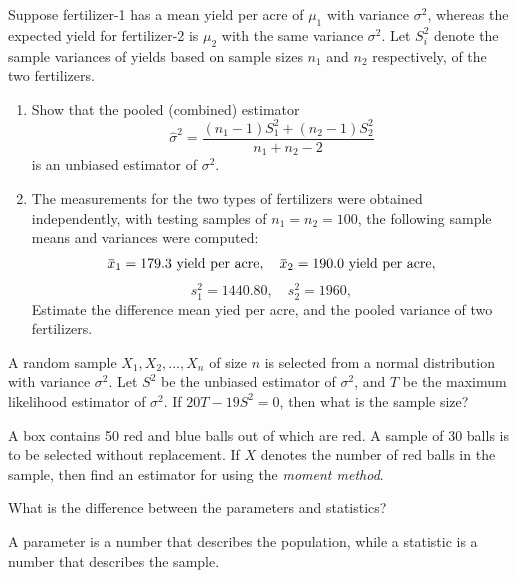 \begin{mdframed}
    \begin{Exercise}
    Suppose fertilizer-1 has a mean yield per acre of $\mu_1$
    with variance $\sigma^2$, whereas the expected yield for fertilizer-2 is $\mu_2$ with the
    same variance $\sigma^2$. Let $S^2_i$ denote the sample variances of yields based on
    sample sizes $n_1$ and $n_2$ respectively, of the two fertilizers.
    \begin{enumerate}
        \item Show that the pooled (combined) estimator 
        \[
            \hat{\sigma}^2 = \frac{(n_1 - 1)S^2_1 + (n_2 - 1)S^2_2}{n_1 + n_2 - 2}
        \]
        is an unbiased estimator of $\sigma^2$.
        \item The measurements for the two types of fertilizers were obtained independently, with 
        testing samples of $n_1 = n_2 = 100$, the following sample means and variances were computed:
        \[
            \ols{x}_1 = 179.3 \text{ yield per acre}, \quad \ols{x}_2 = 190.0 \text{ yield per acre},
        \]
        \[
            s^2_1 = 1440.80, \quad s^2_2 = 1960,
        \]
        Estimate the difference mean yied per acre, and the pooled variance of two fertilizers.
    \end{enumerate}
    \end{Exercise}

    \vspace{0.752cm}
    \begin{Exercise}
        A random sample $X_1, X_2, \ldots, X_n$ of size $n$ is selected from a normal distribution 
        with variance $\sigma^2$. Let $S^2$ be the unbiased estimator of $\sigma^2$, and 
        $T$ be the maximum likelihood estimator of $\sigma^2$. If $20T - 19S^2 = 0$, then what is 
        the sample size?
    \end{Exercise}

    \begin{Exercise}
        A box contains 50 red and blue balls out of which are red. A sample
 of 30 balls is to be selected without replacement. If $X$ denotes the number
 of red balls in the sample, then find an estimator for using the \textit{moment
 method}.
    \end{Exercise}

    \begin{Exercise}
        What is the difference between the parameters and statistics?
    \end{Exercise}
    \begin{Answer}
        A parameter is a number that describes the population, while a statistic 
        is a number that describes the sample. 
    \end{Answer}


\end{mdframed}
